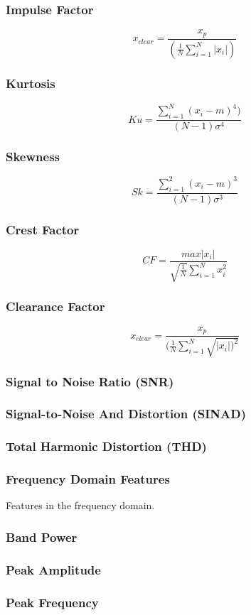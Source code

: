 \documentclass{article}
\begin{document}
  \subsubsection{Impulse Factor} 
  $$ x_{clear} = \frac{x_p}{(\frac{1}{N}\sum^N_{i=1}|x_i|)} $$  
  \subsubsection{Kurtosis} 
  $$ Ku = \frac{\sum^N_{i=1}(x_i-m)^4)}{(N-1)\sigma^4} $$ 
  \subsubsection{Skewness} 
  $$ Sk = \frac{\sum^2_{i=1}(x_i-m)^3}{(N-1)\sigma^3} $$
  \subsubsection{Crest Factor} 
  $$ CF = \frac{max|x_i|}{\sqrt{\frac{1}{N}}\sum^N_{i=1}x^2_i} $$
  \subsubsection{Clearance Factor} 
  $$ x_{clear} = \frac{x_p}{(\frac{1}{N}\sum^N_{i=1}\sqrt{|x_i|)^2}} $$
  \subsubsection{Signal to Noise Ratio (SNR)} 
  \subsubsection{Signal-to-Noise And Distortion (SINAD)} 
  \subsubsection{Total Harmonic Distortion (THD)}   

  \subsubsection{Frequency Domain Features}
  Features in the frequency domain.
  \subsubsection{Band Power}
  \subsubsection{Peak Amplitude}
  \subsubsection{Peak Frequency}
\end{document}
